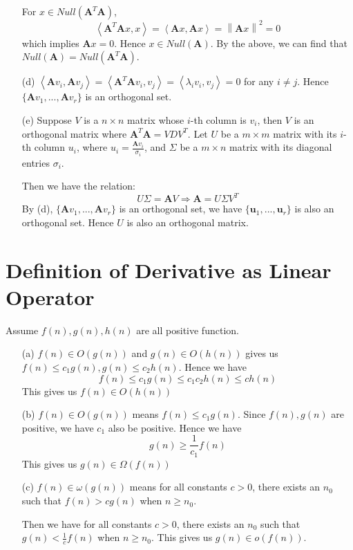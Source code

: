 \documentclass[12pt,a4paper]{article}
\begin{document}
\begin{enumerate}
        For $x\in Null(\mathbf{A}^{T}\mathbf{A})$, 
        \[
            \left\langle \mathbf{A}^{T}\mathbf{A}x, x \right\rangle =  \left\langle \mathbf{A}x, \mathbf{A}x\right\rangle =\left\lVert \mathbf{A}x \right\rVert^{2} = 0
        \]
        which implies $\mathbf{A}x = 0$. Hence $x\in Null(\mathbf{A})$.
        By the above, we can find that $Null(\mathbf{A}) = Null(\mathbf{A}^{T}\mathbf{A})$.
    \item[(d)]
        $\left\langle \mathbf{A}v_{i}, \mathbf{A}v_{j} \right\rangle = \left\langle \mathbf{A}^{T}\mathbf{A} v_{i}, v_{j} \right\rangle = \left\langle \lambda_{i}v_{i}, v_{j} \right\rangle = 0$ for any $i \neq j$. Hence $\{\mathbf{A}v_{1}, ..., \mathbf{A}v_{r}\}$ is an orthogonal set.
    \item[(e)]
        Suppose $V$ is a $n \times n$ matrix whose $i$-th column is $v_{i}$, then $V$ is an orthogonal matrix where $\mathbf{A}^{T}\mathbf{A} = VDV^{T}$. Let $U$ be a $m \times m$ matrix with its $i$-th column $u_{i}$, where $u_{i} = \frac{\mathbf{A}v_{i}}{\sigma_{i}}$, and $\Sigma$ be a $m \times n$ matrix with its diagonal entries $\sigma_{i}$.

        Then we have the relation:
        \[
            U\Sigma = \mathbf{A}V \Rightarrow \mathbf{A} = U\Sigma V^{T}
        \]
        By (d), $\{\mathbf{A}v_{1}, ..., \mathbf{A}v_{r}\}$ is an orthogonal set, we have $\{\mathbf{u}_{1}, ..., \mathbf{u}_{r}\}$ is also an orthogonal set.
        Hence $U$ is also an orthogonal matrix.
\end{enumerate}

\section{Definition of Derivative as Linear Operator}    
Assume $f(n), g(n), h(n)$ are all positive function.
\begin{enumerate}
    \item[(a)]
        $f(n)\in O(g(n))$ and $g(n)\in O(h(n))$ gives us $f(n)\leq c_{1}g(n), g(n) \leq c_{2}h(n)$. Hence we have
        \[
            f(n) \leq c_{1}g(n) \leq c_{1}c_{2}h(n) \leq ch(n)
        \]
        This gives us $f(n)\in O(h(n))$
    \item[(b)]
        $f(n)\in O(g(n))$ means $f(n)\leq c_{1}g(n)$. Since $f(n), g(n)$ are positive, we have $c_{1}$ also be positive. Hence we have
        \[
            g(n) \geq \frac{1}{c_{1}} f(n)
        \]
        This gives us $g(n)\in \Omega (f(n))$
    \item[(c)]
        $f(n)\in \omega(g(n))$ means for all constants $c>0$, there exists an $n_0$ such that $f(n)>cg(n)$ when $n\geq n_0$.
        
        Then we have for all constants $c>0$, there exists an $n_0$ such that $g(n)<\frac{1}{c}f(n)$ when $n\geq n_0$. This gives us $g(n)\in o(f(n))$.
    
\end{enumerate}
\end{document}
